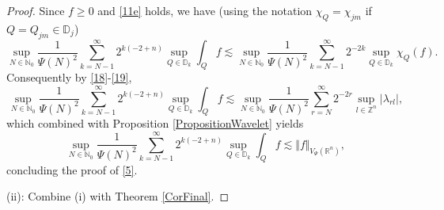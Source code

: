 \documentclass[11pt, a4paper,leqno]{amsart}
\theoremstyle{plain}
\numberwithin{equation}{section}
\theoremstyle{definition}
\theoremstyle{remark}
\begin{document}
\begin{proof}
Since $f\geq0$ and \eqref{11e} holds, we have (using the notation $\chi
_{Q}=\chi_{jm}$ if $Q=Q_{jm} \in \mathbb{D}_j$)
\[
\sup_{N\in\mathbb{N}_{0}}\frac{1}{\Psi(N)^{2}}\sum_{k=N-1}^{\infty}%
2^{k(-2+n)}\sup_{Q\in\mathbb{D}_{k}}\int_{Q}f\lesssim\sup_{N\in\mathbb{N}_{0}%
}\frac{1}{\Psi(N)^{2}}\sum_{k=N-1}^{\infty}2^{-2k}\sup_{Q\in\mathbb{D}_{k}%
}\chi_{Q}(f).
\]
Consequently by \eqref{18}-\eqref{19},
\[
\sup_{N\in\mathbb{N}_{0}}\frac{1}{\Psi(N)^{2}}\sum_{k=N-1}^{\infty}%
2^{k(-2+n)}\sup_{Q\in\mathbb{D}_{k}}\int_{Q}f\lesssim\sup_{N\in\mathbb{N}_{0}%
}\frac{1}{\Psi(N)^{2}}\sum_{r=N}^{\infty}2^{-2r}\sup_{l\in\mathbb{Z}^{n}%
}|\lambda_{rl}|,
\]
which combined with Proposition \ref{PropositionWavelet} yields
\[
\sup_{N\in\mathbb{N}_{0}}\frac{1}{\Psi(N)^{2}}\sum_{k=N-1}^{\infty}%
2^{k(-2+n)}\sup_{Q\in\mathbb{D}_{k}}\int_{Q}f\lesssim\Vert f\Vert_{V_{\Psi
}(\mathbb{R}^{n})},
\]
concluding the proof of \eqref{5}.

(ii): Combine (i) with Theorem \ref{CorFinal}. 
\end{proof}
\end{document}
